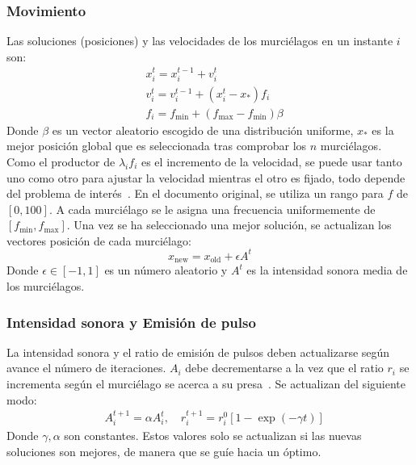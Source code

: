 \subsubsection{Movimiento}

Las soluciones (posiciones) y las velocidades de los murciélagos en un instante $i$ son:
\begin{equation}
    \begin{aligned}
         & x_i^t = x_i^{t-1} + v_i^t                                      \\
         & v_i^t = v_i^{t-1} + (x_i^t - x_*) f_i                          \\
         & f_i = f_{\text{min}} + (f_{\text{max}} - f_{\text{min}}) \beta
    \end{aligned}
\end{equation}
Donde $\beta$ es un vector aleatorio escogido de una distribución uniforme, $x_*$ es la mejor posición global que es seleccionada tras comprobar los $n$ murciélagos. Como el productor de $\lambda_i f_i$ es el incremento de la velocidad, se puede usar tanto uno como otro para ajustar la velocidad mientras el otro es fijado, todo depende del problema de interés~\cite{yang_new_2010}. En el documento original, se utiliza un rango para $f$ de $[0,100]$. A cada murciélago se le asigna una frecuencia uniformemente de $[f_{\text{min}},f_{\text{max}}]$. Una vez se ha seleccionado una mejor solución, se actualizan los vectores posición de cada murciélago:
\begin{equation}
    x_{\text{new}} = x_{\text{old}} + \epsilon A^t
\end{equation}
Donde $\epsilon \in [-1,1]$ es un número aleatorio y $A^t$ es la intensidad sonora media de los murciélagos.

\subsubsection{Intensidad sonora y Emisión de pulso}

La intensidad sonora y el ratio de emisión de pulsos deben actualizarse según avance el número de iteraciones. $A_i$ debe decrementarse a la vez que el ratio $r_i$ se incrementa según el murciélago se acerca a su presa~\cite{yang_new_2010}. Se actualizan del siguiente modo:
\begin{equation}
    \begin{aligned}
         & A_i^{t+1} = \alpha A_i^t, \quad r_i^{t+1} = r_i^0 [1 - \exp(-\gamma t)]
    \end{aligned}
\end{equation}
Donde $\gamma, \alpha$ son constantes. Estos valores solo se actualizan si las nuevas soluciones son mejores, de manera que se guíe hacia un óptimo.

